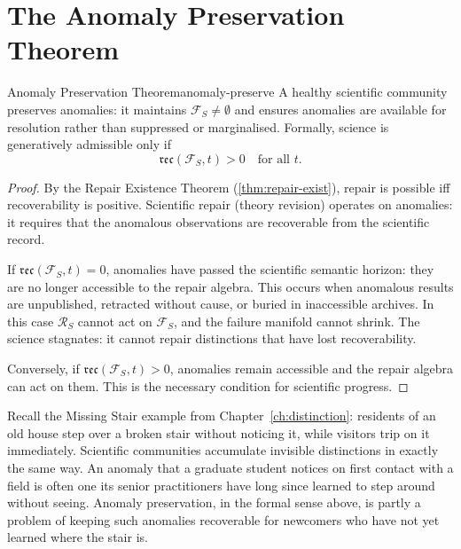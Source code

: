 \documentclass[12pt,twoside,openright]{book}
\newcommand{\reco}{\mathfrak{rec}}
\begin{document}
\section{The Anomaly Preservation Theorem}

\begin{theorem}{Anomaly Preservation Theorem}{anomaly-preserve}
  A healthy scientific community preserves anomalies:
  it maintains $\mathcal{F}_S \ne \emptyset$
  and ensures anomalies are available for resolution
  rather than suppressed or marginalised.
  Formally, science is generatively admissible only if
  \[
    \reco(\mathcal{F}_S, t) > 0
    \quad\text{for all } t.
  \]
\end{theorem}

\begin{proof}
  By the Repair Existence Theorem
  (\cref{thm:repair-exist}), repair is possible iff
  recoverability is positive. Scientific repair
  (theory revision) operates on anomalies: it requires
  that the anomalous observations are recoverable from
  the scientific record.

  If $\reco(\mathcal{F}_S, t) = 0$, anomalies have
  passed the scientific semantic horizon: they are
  no longer accessible to the repair algebra.
  This occurs when anomalous results are unpublished,
  retracted without cause, or buried in inaccessible
  archives.
  In this case $\mathcal{R}_S$ cannot act on
  $\mathcal{F}_S$, and the failure manifold cannot shrink.
  The science stagnates: it cannot repair distinctions
  that have lost recoverability.

  Conversely, if $\reco(\mathcal{F}_S, t) > 0$,
  anomalies remain accessible and the repair algebra
  can act on them. This is the necessary condition for
  scientific progress.
\end{proof}

Recall the Missing Stair example from
Chapter~\ref{ch:distinction}: residents of an old house step
over a broken stair without noticing it, while visitors trip
on it immediately. Scientific communities accumulate
invisible distinctions in exactly the same way. An anomaly
that a graduate student notices on first contact with a field
is often one its senior practitioners have long since learned
to step around without seeing. Anomaly preservation, in the
formal sense above, is partly a problem of keeping such
anomalies recoverable for newcomers who have not yet learned
where the stair is.
\end{document}

